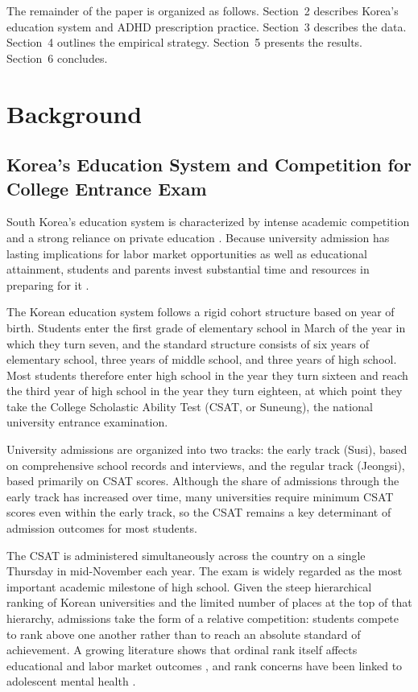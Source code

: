 \documentclass[12pt]{article}
\begin{document}
The remainder of the paper is organized as follows. Section~2 describes Korea's education system and ADHD prescription practice. Section~3 describes the data. Section~4 outlines the empirical strategy. Section~5 presents the results. Section~6 concludes.

\section{Background}

\subsection{Korea's Education System and Competition for College Entrance Exam}

South Korea's education system is characterized by intense academic competition and a strong reliance on private education \citep{oecd2025}. Because university admission has lasting implications for labor market opportunities as well as educational attainment, students and parents invest substantial time and resources in preparing for it \citep{kim2010,han2025}.

The Korean education system follows a rigid cohort structure based on year of birth. Students enter the first grade of elementary school in March of the year in which they turn seven, and the standard structure consists of six years of elementary school, three years of middle school, and three years of high school. Most students therefore enter high school in the year they turn sixteen and reach the third year of high school in the year they turn eighteen, at which point they take the College Scholastic Ability Test (CSAT, or Suneung), the national university entrance examination.

University admissions are organized into two tracks: the early track (Susi), based on comprehensive school records and interviews, and the regular track (Jeongsi), based primarily on CSAT scores. Although the share of admissions through the early track has increased over time, many universities require minimum CSAT scores even within the early track, so the CSAT remains a key determinant of admission outcomes for most students.

The CSAT is administered simultaneously across the country on a single Thursday in mid-November each year. The exam is widely regarded as the most important academic milestone of high school. Given the steep hierarchical ranking of Korean universities and the limited number of places at the top of that hierarchy, admissions take the form of a relative competition: students compete to rank above one another rather than to reach an absolute standard of achievement. A growing literature shows that ordinal rank itself affects educational and labor market outcomes \citep{murphy2020,elsner2021,denning2023}, and rank concerns have been linked to adolescent mental health \citep{fawaz2022}.
\end{document}
